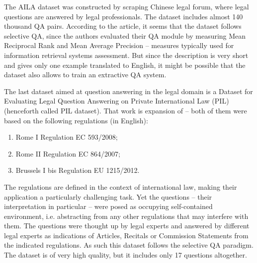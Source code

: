 \documentclass{IOS-Book-Article}
\begin{document}
The AILA dataset \cite{weiyi2020aila} was constructed by scraping Chinese legal forum, where legal questions are answered by legal professionals. The dataset includes almost 140 thousand QA pairs. According to the article, it seems that the dataset follows selective QA, since the authors evaluated their QA module by measuring Mean Reciprocal Rank and Mean Average Precision -- measures typically used for information retrieval systems assessment. But since the description is very short and gives only one example translated to English, it might be possible that the dataset also allows to train an
extractive QA system.

The last dataset aimed at question answering in the legal domain is a Dataset for Evaluating Legal Question Answering on Private International Law (PIL) \cite{sovrano2021dataset} (henceforth called PIL dataset). That work is expansion of \cite{sovrano2020legal} -- both of them were based on the following regulations (in English): 
\begin{enumerate}
  \item Rome I Regulation EC 593/2008;
  \item  Rome II Regulation EC 864/2007;
  \item Brussels I bis Regulation EU 1215/2012.
\end{enumerate}
The regulations are defined in the context of international law, making their application a particularly challenging task. Yet the questions -- their interpretation in particular -- were posed as occupying self-contained environment, i.e. abstracting from any other regulations that may interfere with them. The questions were thought up by legal experts and answered by different legal experts as indications of Articles, Recitals or Commission Statements from the indicated
regulations. As such this dataset follows the selective QA paradigm. The dataset is of very high quality, but it includes only 17 questions altogether.



\end{document}
